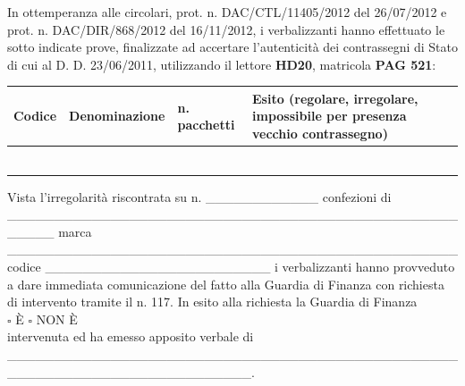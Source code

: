 \documentclass[12pt]{article}
\begin{document}
\newpage

In ottemperanza alle circolari, prot. n. DAC/CTL/11405/2012 del 26/07/2012 e prot. n. DAC/DIR/868/2012 del 16/11/2012, i verbalizzanti hanno effettuato le sotto indicate prove, finalizzate ad accertare l’autenticità dei contrassegni di Stato di cui al D. D. 23/06/2011, utilizzando il lettore \textbf{HD20}, matricola \textbf{PAG 521}:

\begin{tabularx}{\textwidth}{|p{}|p{}|p{}|Y|}
    \hline
    Codice & Denominazione & n. pacchetti & Esito (regolare, irregolare, impossibile per presenza vecchio contrassegno)  \\
    \hline
     & & & \\[20pt]
    \hline
     & & & \\[20pt]
    \hline
     & & & \\[20pt]
    \hline
     & & & \\[20pt]
    \hline
     & & & \\[20pt]
    \hline
     & & & \\[20pt]
    \hline
\end{tabularx}

Vista l’irregolarità riscontrata su n. \_\_\_\_\_\_\_\_\_\_\_\_ confezioni di \_\_\_\_\_\_\_\_\_\_\_\_\_\_\_\_\_\_\_\_\_\_\_\_\_\_\_\_\_\_\_\_\_\_\_\_\_\_\_\_\_\_\_\_\_\_\_\_\_\_\_\_\_ marca \_\_\_\_\_\_\_\_\_\_\_\_\_\_\_\_\_\_\_\_\_\_\_\_\_\_\_\_\_\_\_\_\_\_\_\_\_\_\_\_\_\_\_\_\_\_\_\_ codice  \_\_\_\_\_\_\_\_\_\_\_\_\_\_\_\_\_\_\_\_\_\_\_\_ i verbalizzanti hanno provveduto a dare immediata comunicazione  del fatto alla Guardia di Finanza con richiesta di intervento tramite il n. 117.  In esito alla richiesta la Guardia di Finanza \\
\begin{math}\square\end{math} È \begin{math}\square\end{math} NON È\\
intervenuta ed ha emesso apposito verbale  di \_\_\_\_\_\_\_\_\_\_\_\_\_\_\_\_\_\_\_\_\_\_\_\_\_\_\_\_\_\_\_\_\_\_\_\_\_\_\_\_\_\_\_\_\_\_\_\_\_\_\_\_\_\_\_\_\_\_\_\_\_\_\_\_\_\_\_\_\_\_\_\_\_\_.
\end{document}
